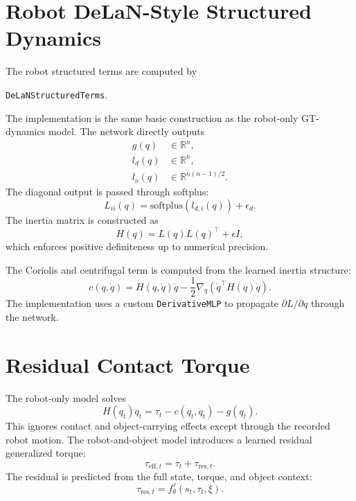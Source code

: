 \documentclass[11pt]{article}
\begin{document}
\section{Robot DeLaN-Style Structured Dynamics}

The robot structured terms are computed by
\begin{center}
\texttt{DeLaNStructuredTerms}.
\end{center}
The implementation is the same basic construction as the robot-only GT-dynamics
model. The network directly outputs
\begin{align}
  g(q) &\in \mathbb{R}^{n}, \\
  l_d(q) &\in \mathbb{R}^{n}, \\
  l_o(q) &\in \mathbb{R}^{n(n-1)/2}.
\end{align}
The diagonal output is passed through softplus:
\begin{equation}
  L_{ii}(q) = \mathrm{softplus}(l_{d,i}(q)) + \epsilon_d.
\end{equation}
The inertia matrix is constructed as
\begin{equation}
  H(q) = L(q)L(q)^\top + \epsilon I,
\end{equation}
which enforces positive definiteness up to numerical precision.

The Coriolis and centrifugal term is computed from the learned inertia structure:
\begin{equation}
  c(q,\dot{q})
  =
  \dot{H}(q,\dot{q})\dot{q}
  -
  \frac{1}{2}
  \nabla_q
  \left(
    \dot{q}^{\top}H(q)\dot{q}
  \right).
\end{equation}
The implementation uses a custom \texttt{DerivativeMLP} to propagate
\(\partial L/\partial q\) through the network.

\section{Residual Contact Torque}

The robot-only model solves
\begin{equation}
  H(q_t)\ddot{q}_t =
  \tau_t - c(q_t,\dot{q}_t) - g(q_t).
\end{equation}
This ignores contact and object-carrying effects except through the recorded
robot motion. The robot-and-object model introduces a learned residual
generalized torque:
\begin{equation}
  \tau_{\mathrm{eff},t}
  =
  \tau_t
  +
  \tau_{\mathrm{res},t}.
\end{equation}
The residual is predicted from the full state, torque, and object context:
\begin{equation}
  \tau_{\mathrm{res},t}
  =
  f_{\theta}^{\tau}
  \left(
    s_t,
    \tau_t,
    \xi
  \right).
\end{equation}
\end{document}
